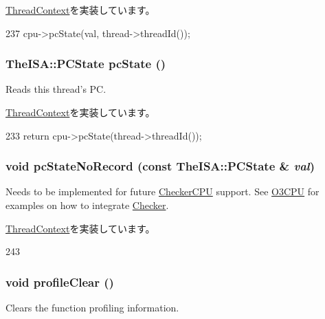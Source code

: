 \hyperlink{classThreadContext_a8f9949be84d3a2db4137f9e49ce32952}{ThreadContext}を実装しています。


\begin{DoxyCode}
237     { cpu->pcState(val, thread->threadId()); }
\end{DoxyCode}
\hypertarget{classInOrderThreadContext_a827fb3454585cf4c620f4fd341966317}{
\subsubsection[{pcState}]{\setlength{\rightskip}{0pt plus 5cm}TheISA::PCState pcState ()}}
\label{classInOrderThreadContext_a827fb3454585cf4c620f4fd341966317}
Reads this thread's PC. 

\hyperlink{classThreadContext_a1aaca26c0732d2191edbde1477d7ec13}{ThreadContext}を実装しています。


\begin{DoxyCode}
233     { return cpu->pcState(thread->threadId()); }
\end{DoxyCode}
\hypertarget{classInOrderThreadContext_a6005386aeeaecb35499c3199fb47ba2f}{
\subsubsection[{pcStateNoRecord}]{\setlength{\rightskip}{0pt plus 5cm}void pcStateNoRecord (const TheISA::PCState \& {\em val})}}
\label{classInOrderThreadContext_a6005386aeeaecb35499c3199fb47ba2f}
Needs to be implemented for future \hyperlink{classCheckerCPU}{CheckerCPU} support. See \hyperlink{namespaceO3CPU}{O3CPU} for examples on how to integrate \hyperlink{classChecker}{Checker}. 

\hyperlink{classThreadContext_aaeee41ee07ac94c41a94512f28a431fa}{ThreadContext}を実装しています。


\begin{DoxyCode}
243     {}
\end{DoxyCode}
\hypertarget{classInOrderThreadContext_acf9c88860776d7bd752317e8b550a5d5}{
\subsubsection[{profileClear}]{\setlength{\rightskip}{0pt plus 5cm}void profileClear ()}}
\label{classInOrderThreadContext_acf9c88860776d7bd752317e8b550a5d5}
Clears the function profiling information. 

